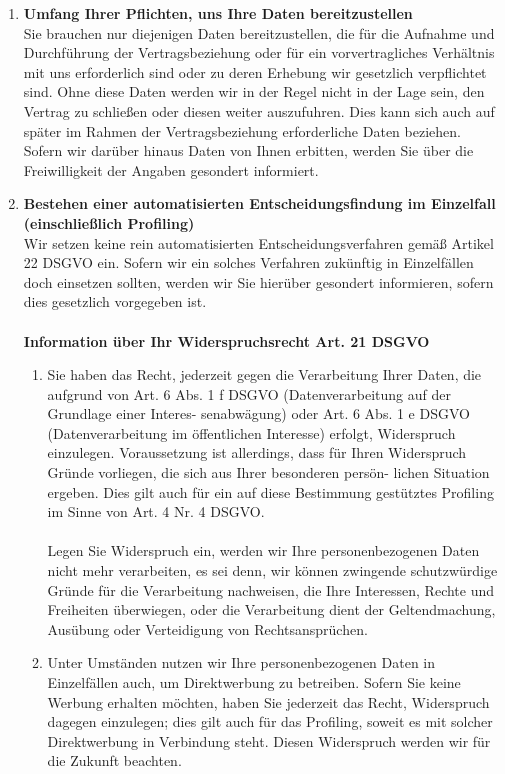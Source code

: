 \documentclass[a4paper, fontsize=11pt]{scrartcl}
\begin{document}
\begin{enumerate}[label=\textbf{\arabic*.},ref=\arabic*]
  \item \label{umfang} \textbf{Umfang Ihrer Pflichten, uns Ihre Daten bereitzustellen} \\ Sie brauchen nur diejenigen Daten bereitzustellen, die für die Aufnahme und Durchführung der Vertragsbeziehung oder für ein vorvertragliches Verhältnis mit uns erforderlich sind oder zu deren Erhebung wir gesetzlich verpflichtet sind. Ohne diese Daten werden wir in der Regel nicht in der Lage sein, den Vertrag zu schließen oder diesen weiter auszufuhren. Dies kann sich auch auf später im Rahmen der Vertragsbeziehung erforderliche Daten beziehen. Sofern wir darüber hinaus Daten von Ihnen erbitten, werden Sie über die Freiwilligkeit der Angaben gesondert informiert.
  \item \label{entscheidung} \textbf{Bestehen einer automatisierten Entscheidungsfindung im Einzelfall (einschließlich Profiling)} \\ Wir setzen keine rein automatisierten Entscheidungsverfahren gemäß Artikel 22 DSGVO ein. Sofern wir ein solches Verfahren zukünftig in Einzelfällen doch einsetzen sollten, werden wir Sie hierüber gesondert informieren, sofern dies gesetzlich vorgegeben ist.\\\\
  \textbf{Information über Ihr Widerspruchsrecht Art. 21 DSGVO}
  \begin{enumerate}[label=\textbf{\arabic*.}]
    \item Sie haben das Recht, jederzeit gegen die Verarbeitung Ihrer Daten, die aufgrund von Art. 6 Abs. 1 f DSGVO (Datenverarbeitung auf der Grundlage einer Interes- senabwägung) oder Art. 6 Abs. 1 e DSGVO (Datenverarbeitung im öffentlichen Interesse) erfolgt, Widerspruch einzulegen. Voraussetzung ist allerdings, dass für Ihren Widerspruch Gründe vorliegen, die sich aus Ihrer besonderen persön- lichen Situation ergeben. Dies gilt auch für ein auf diese Bestimmung gestütztes Profiling im Sinne von Art. 4 Nr. 4 DSGVO. \\\\
    Legen Sie Widerspruch ein, werden wir Ihre personenbezogenen Daten nicht mehr verarbeiten, es sei denn, wir können zwingende schutzwürdige Gründe für die Verarbeitung nachweisen, die Ihre Interessen, Rechte und Freiheiten überwiegen, oder die Verarbeitung dient der Geltendmachung, Ausübung oder Verteidigung von Rechtsansprüchen.
    \item Unter Umständen nutzen wir Ihre personenbezogenen Daten in Einzelfällen auch, um Direktwerbung zu betreiben. Sofern Sie keine Werbung erhalten möchten, haben Sie jederzeit das Recht, Widerspruch dagegen einzulegen; dies gilt auch für das Profiling, soweit es mit solcher Direktwerbung in Verbindung steht. Diesen Widerspruch werden wir für die Zukunft beachten. \\\\

\end{enumerate}
\end{enumerate}
\end{document}
